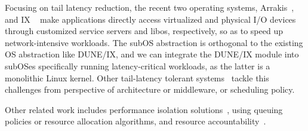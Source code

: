 \documentclass[pageno]{jpaper}
\begin{document}
Focusing on tail latency reduction, the recent two operating systems, Arrakis~\cite{peter2014arrakis, Baumann:2009:multikernel}, and IX ~\cite{belay2014ix, Belay:2012:DSU:2387880.2387913} make applications directly access virtualized and physical I/O devices  through customized service servers and libos, respectively, so as to speed up network-intensive workloads. The subOS abstraction is orthogonal to the existing OS abstraction like DUNE/IX, and we can integrate the DUNE/IX module into subOSes specifically running latency-critical workloads, as the latter is a monolithic Linux kernel. Other tail-latency tolerant systems~\cite{kasture2014ubik, leverich2014reconciling, litales, jalaparti2013speeding, vulimiri2012more, ravindranath2013timecard, zhang2013cpi} tackle this challenges from perspective of architecture or middleware, or scheduling policy.

 Other related  work includes performance isolation solutions~\cite{verghese1998performance, shue2012performance, Gulati:2010:MHT:1924943.1924974, Ghodsi:2011:DRF:1972457.1972490}, using queuing policies or resource allocation algorithms, and resource accountability~\cite{chen2013towards, sekar2011verifiable, agmon2012resource}.
\end{document}
